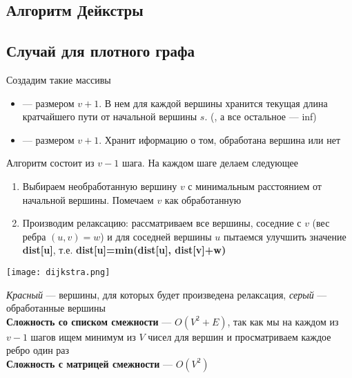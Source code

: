 \documentclass[a4paper]{article}
\begin{document}
\subsection{Алгоритм Дейкстры}
\subsection*{Случай для плотного графа}
Создадим такие массивы
\begin{itemize}
    \item {} — размером $v+1$. В нем для каждой вершины хранится текущая длина кратчайшего пути от начальной вершины $s$. (, а все остальное — inf)
    \item {} — размером $v+1$. Хранит иформацию о том, обработана вершина или нет
\end{itemize}
Алгоритм состоит из $v-1$ шага. На каждом шаге делаем следующее
\begin{enumerate}
    \item Выбираем необработанную вершину $v$ с минимальным расстоянием от начальной вершины. Помечаем $v$ как обработанную
    \item Производим релаксацию: рассматриваем все вершины, соседние с $v$ (вес ребра $(u,v)=w$) и для соседней вершины $u$ пытаемся улучшить значение \textbf{dist[u]}, т.е. \textbf{dist[u]=min(dist[u], dist[v]+w)}
\end{enumerate}
\begin{center}
    \texttt{[image: dijkstra.png]}
    \label{dijkstra}
\end{center}
\textit{Красный} — вершины, для которых будет произведена релаксация, \textit{серый} — обработанные вершины\\[2mm]
\textbf{Сложность со списком смежности} — $O(V^2+E)$, так как мы на каждом из $v-1$ шагов ищем минимум из $V$ чисел для вершин и просматриваем каждое ребро один раз\\[2mm]
\textbf{Сложность с матрицей смежности} — $O(V^2)$
\end{document}
